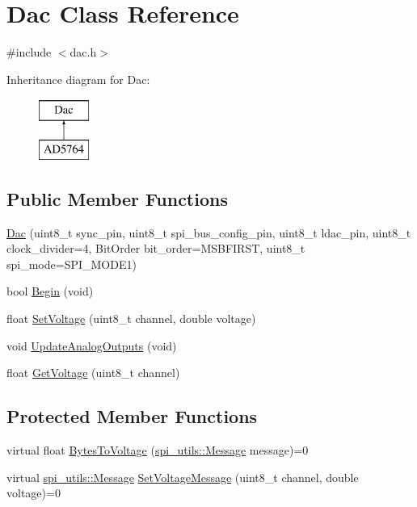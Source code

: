 \hypertarget{classDac}{}\section{Dac Class Reference}
\label{classDac}


{\ttfamily \#include $<$dac.\+h$>$}

Inheritance diagram for Dac\+:\begin{figure}[H]
\begin{center}
\leavevmode
\includegraphics[height=2.000000cm]{classDac}
\end{center}
\end{figure}
\subsection*{Public Member Functions}
\begin{DoxyCompactItemize}
\item 
\mbox{\hyperlink{classDac_ae74afbc4c82a8acbd8c74dcf4ea046ba}{Dac}} (uint8\+\_\+t sync\+\_\+pin, uint8\+\_\+t spi\+\_\+bus\+\_\+config\+\_\+pin, uint8\+\_\+t ldac\+\_\+pin, uint8\+\_\+t clock\+\_\+divider=4, Bit\+Order bit\+\_\+order=M\+S\+B\+F\+I\+R\+ST, uint8\+\_\+t spi\+\_\+mode=S\+P\+I\+\_\+\+M\+O\+D\+E1)
\item 
bool \mbox{\hyperlink{classDac_ad88e0048e59c0633b72769ddb8337e49}{Begin}} (void)
\item 
float \mbox{\hyperlink{classDac_a905acd38131fe25a04aeace0bcf1ba30}{Set\+Voltage}} (uint8\+\_\+t channel, double voltage)
\item 
void \mbox{\hyperlink{classDac_aafef1707ec33a2166a69e9b646cd471b}{Update\+Analog\+Outputs}} (void)
\item 
float \mbox{\hyperlink{classDac_a55688546d527c42ebf48a12204e69731}{Get\+Voltage}} (uint8\+\_\+t channel)
\end{DoxyCompactItemize}
\subsection*{Protected Member Functions}
\begin{DoxyCompactItemize}
\item 
virtual float \mbox{\hyperlink{classDac_a506a65776c631fb3abc6609e58046655}{Bytes\+To\+Voltage}} (\mbox{\hyperlink{structspi__utils_1_1Message}{spi\+\_\+utils\+::\+Message}} message)=0
\item 
virtual \mbox{\hyperlink{structspi__utils_1_1Message}{spi\+\_\+utils\+::\+Message}} \mbox{\hyperlink{classDac_a87132e3c19313742d92f57d9b792e0e0}{Set\+Voltage\+Message}} (uint8\+\_\+t channel, double voltage)=0
\end{DoxyCompactItemize}


